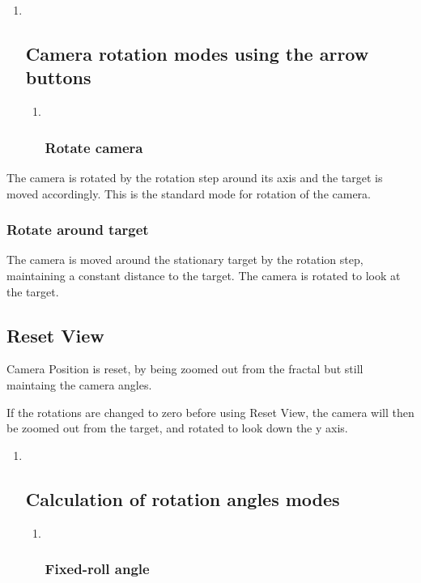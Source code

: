 \begin{enumerate}
\def\labelenumi{\arabic{enumi}.}
\item ~
  \hypertarget{camera-rotation-modes-using-the-arrow-buttons}{\subsection{Camera
  rotation modes using the arrow
  buttons}\label{camera-rotation-modes-using-the-arrow-buttons}}

  \begin{enumerate}
  \def\labelenumii{\alph{enumii}.}
  \item ~
    \subsubsection{Rotate camera}\label{rotate-camera}
  \end{enumerate}
\end{enumerate}

The camera is rotated by the rotation step around its axis and the
target is moved accordingly. This is the standard mode for rotation of
the camera.

\subsubsection{Rotate around target}\label{rotate-around-target}

The camera is moved around the stationary target by the rotation step,
maintaining a constant distance to the target. The camera is rotated to
look at the target.

\hypertarget{reset-view}{\subsection{Reset View}\label{reset-view}}

Camera Position is reset, by being zoomed out from the fractal but still
maintaing the camera angles.

If the rotations are changed to zero before using Reset View, the camera
will then be zoomed out from the target, and rotated to look down the y
axis.

\begin{enumerate}
\def\labelenumi{\arabic{enumi}.}
\item ~
  \hypertarget{calculation-of-rotation-angles-modes}{\subsection{Calculation
  of rotation angles modes}\label{calculation-of-rotation-angles-modes}}

  \begin{enumerate}
  \def\labelenumii{\alph{enumii}.}
  \item ~
    \subsubsection{Fixed-roll angle}\label{fixed-roll-angle}
  \end{enumerate}
\end{enumerate}

